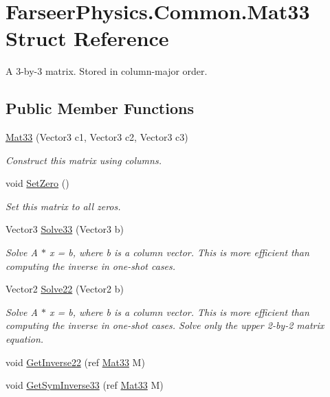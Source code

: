 \hypertarget{struct_farseer_physics_1_1_common_1_1_mat33}{\section{Farseer\+Physics.\+Common.\+Mat33 Struct Reference}
\label{struct_farseer_physics_1_1_common_1_1_mat33}
}


A 3-\/by-\/3 matrix. Stored in column-\/major order.  


\subsection*{Public Member Functions}
\begin{DoxyCompactItemize}
\item 
\hyperlink{struct_farseer_physics_1_1_common_1_1_mat33_ac84482abfc43f5842f219e6e4adee774}{Mat33} (Vector3 c1, Vector3 c2, Vector3 c3)
\begin{DoxyCompactList}\small\item\em Construct this matrix using columns. \end{DoxyCompactList}\item 
void \hyperlink{struct_farseer_physics_1_1_common_1_1_mat33_a5704cacf267909772949b573542cadfb}{Set\+Zero} ()
\begin{DoxyCompactList}\small\item\em Set this matrix to all zeros. \end{DoxyCompactList}\item 
Vector3 \hyperlink{struct_farseer_physics_1_1_common_1_1_mat33_a24cc2751b2e8e78404fdc1e24b54f9f4}{Solve33} (Vector3 b)
\begin{DoxyCompactList}\small\item\em Solve A $\ast$ x = b, where b is a column vector. This is more efficient than computing the inverse in one-\/shot cases. \end{DoxyCompactList}\item 
Vector2 \hyperlink{struct_farseer_physics_1_1_common_1_1_mat33_acbdfb25dac490f23c67f7096ebff8d87}{Solve22} (Vector2 b)
\begin{DoxyCompactList}\small\item\em Solve A $\ast$ x = b, where b is a column vector. This is more efficient than computing the inverse in one-\/shot cases. Solve only the upper 2-\/by-\/2 matrix equation. \end{DoxyCompactList}\item 
void \hyperlink{struct_farseer_physics_1_1_common_1_1_mat33_a3840056f6325213513c9a2ad0debda0c}{Get\+Inverse22} (ref \hyperlink{struct_farseer_physics_1_1_common_1_1_mat33}{Mat33} M)
\item 
void \hyperlink{struct_farseer_physics_1_1_common_1_1_mat33_a4fab8f7880d1f673479b5e907734f840}{Get\+Sym\+Inverse33} (ref \hyperlink{struct_farseer_physics_1_1_common_1_1_mat33}{Mat33} M)
\end{DoxyCompactItemize}
